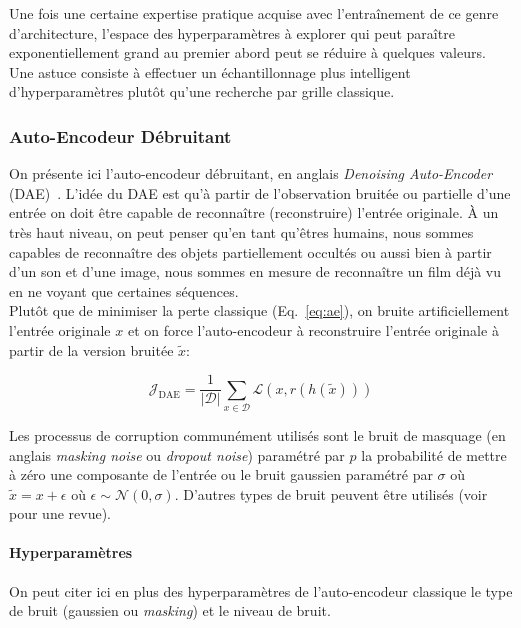 Une fois une certaine expertise pratique acquise avec l'entraînement de ce
genre d'architecture, l'espace des hyperparamètres à explorer qui peut
paraître exponentiellement grand au premier abord peut se réduire à quelques
valeurs.  Une astuce consiste à effectuer un échantillonnage plus intelligent
d'hyperparamètres \citep{rnn14} plutôt qu'une recherche par grille classique.

\subsubsection{Auto-Encodeur Débruitant}

On présente ici l'auto-encodeur débruitant, en anglais \textit{Denoising
Auto-Encoder} (DAE)~\citep{VincentPLarochelleH2008}.  L'idée du DAE est qu'à partir de l'observation bruitée ou partielle
d'une entrée on doit être capable de reconnaître (reconstruire) l'entrée
originale. À un très haut niveau, on peut penser qu'en tant qu'êtres humains,
nous sommes capables de reconnaître des objets partiellement occultés ou aussi
bien à partir d'un son et d'une image, nous sommes en mesure de reconnaître un
film déjà vu en ne voyant que certaines séquences.  \\

Plutôt que de minimiser la perte classique (Eq.~\ref{eq:ae}), on bruite artificiellement l'entrée originale
$x$ et on force l'auto-encodeur à reconstruire l'entrée originale à partir de
la version bruitée $\tilde{x}$:

\begin{equation}
\mathcal{J}_{\textrm{DAE}} = \frac{1}{\vert \mathcal{D}\vert}\sum_{x\in\mathcal{D}}\mathcal{L}(x,r(h(\tilde{x})))
\label{eq:dae}
\end{equation}

Les processus de corruption communément utilisés sont le bruit de masquage (en anglais \textit{masking noise} ou 
\textit{dropout noise})
paramétré par $p$ la probabilité de mettre à zéro une composante de l'entrée ou
le bruit gaussien paramétré par $\sigma$ où $\tilde{x} = x + \epsilon$ où
$\epsilon \sim \mathcal{N}(0,\sigma)$. D'autres types de bruit
peuvent être utilisés (voir \cite{Vincent-JMLR-2010} pour une revue).

\paragraph{Hyperparamètres} On peut citer ici en plus des hyperparamètres de
l'auto-encodeur classique le type de bruit (gaussien ou \textit{masking}) et le niveau
de bruit.

